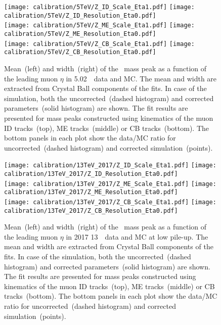 	\begin{figure}[htb!]
		\begin{center}
			\texttt{[image: calibration/5TeV/Z\_ID\_Scale\_Eta1.pdf]}
			\texttt{[image: calibration/5TeV/Z\_ID\_Resolution\_Eta0.pdf]}\\
			\texttt{[image: calibration/5TeV/Z\_ME\_Scale\_Eta1.pdf]}
			\texttt{[image: calibration/5TeV/Z\_ME\_Resolution\_Eta0.pdf]}\\
			\texttt{[image: calibration/5TeV/Z\_CB\_Scale\_Eta1.pdf]}
			\texttt{[image: calibration/5TeV/Z\_CB\_Resolution\_Eta0.pdf]}
			\caption{Mean~(left) and width~(right) of the \Zmm\ mass peak as a function of the leading muon $\eta$ in 5.02~\TeV\ data and MC. The mean and width are extracted from Crystal Ball components of the fits. In case of the simulation, both the uncorrected~(dashed histogram) and corrected parameters~(solid histogram) are shown. The fit results are presented for mass peaks constructed using kinematics of the muon ID tracks~(top), ME tracks~(middle) or CB tracks~(bottom). The bottom panels in each plot show the data/MC ratio for uncorrected~(dashed histogram) and corrected simulation~(points).}
			\label{fig:calib-Z-5TeV}
		\end{center}
	\end{figure}
	
	\begin{figure}[htb!]
		\begin{center}
			\texttt{[image: calibration/13TeV\_2017/Z\_ID\_Scale\_Eta1.pdf]}
			\texttt{[image: calibration/13TeV\_2017/Z\_ID\_Resolution\_Eta0.pdf]}\\
			\texttt{[image: calibration/13TeV\_2017/Z\_ME\_Scale\_Eta1.pdf]}
			\texttt{[image: calibration/13TeV\_2017/Z\_ME\_Resolution\_Eta0.pdf]}\\
			\texttt{[image: calibration/13TeV\_2017/Z\_CB\_Scale\_Eta1.pdf]}
			\texttt{[image: calibration/13TeV\_2017/Z\_CB\_Resolution\_Eta0.pdf]}
			\caption{Mean~(left) and width~(right) of the \Zmm\ mass peak as a function of the leading muon $\eta$ in 2017 13~\TeV\ data and MC at low pile-up. The mean and width are extracted from Crystal Ball components of the fits. In case of the simulation, both the uncorrected~(dashed histogram) and corrected parameters~(solid histogram) are shown. The fit results are presented for mass peaks constructed using kinematics of the muon ID tracks~(top), ME tracks~(middle) or CB tracks~(bottom). The bottom panels in each plot show the data/MC ratio for uncorrected~(dashed histogram) and corrected simulation~(points).}
			\label{fig:calib-Z-13TeV}
		\end{center}
	\end{figure}
